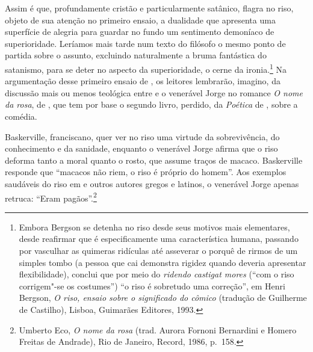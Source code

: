 Assim é que, profundamente cristão e particularmente satânico,
 flagra no riso, objeto de sua atenção no primeiro ensaio, a
dualidade que apresenta uma superfície de alegria para guardar no fundo
um sentimento demoníaco de superioridade. Leríamos mais tarde num texto
do filósofo  o mesmo ponto de partida sobre o assunto,
excluindo naturalmente a bruma fantástica do satanismo, para se deter
no aspecto da superioridade, o cerne da ironia.\footnote{ Embora Bergson	
se detenha no riso desde seus motivos mais elementares, desde reafirmar
que é especificamente uma característica humana, passando por vasculhar
as quimeras ridículas até asseverar o porquê de rirmos de um simples
tombo (a pessoa que cai demonstra rigidez quando deveria apresentar
flexibilidade), conclui que por meio do \textit{ridendo castigat mores}
(“com o riso corrigem"-se os costumes”) “o riso é sobretudo uma
correção”, em Henri Bergson, \textit{O riso, ensaio sobre o
significado do cômico} (tradução de Guilherme de Castilho),  Lisboa,		
Guimarães Editores, 1993.} Na argumentação desse primeiro ensaio de
, os leitores lembrarão, imagino, da discussão mais ou menos
teológica entre  e o venerável Jorge no romance
\textit{O nome da rosa}, de , que tem por base o segundo
livro, perdido, da \textit{Poética} de , sobre a comédia. 

Baskerville, franciscano, quer ver no riso uma virtude da sobrevivência,
do conhecimento e da sanidade, enquanto o venerável Jorge afirma que o
riso deforma tanto a moral quanto o rosto, que assume traços de macaco.
Baskerville responde que “macacos não riem, o riso é próprio do homem”.
Aos exemplos saudáveis do riso em  e outros autores gregos e
latinos, o venerável Jorge apenas retruca: “Eram pagãos”.\footnote{ Umberto Eco,
 \textit{O nome da rosa} (trad. Aurora Fornoni Bernardini
e Homero Freitas de Andrade), Rio de Janeiro, Record, 1986, p.~158.}

